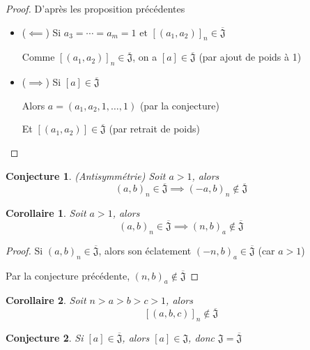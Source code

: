 \documentclass{article}
\newtheorem{conjecture}{Conjecture}
\newtheorem{corollary}{Corollaire}
\newcommand{\J}{\mathfrak{J}}
\newcommand{\JS}{\overline{\J}}
\begin{document}
\begin{proof} D'après les proposition précédentes
    \begin{itemize}
        \item ($\impliedby$) Si $a_3 = \cdots = a_m = 1 \text{ et } {[(a_1, a_2)]}_n \in \JS$
        
            Comme ${[(a_1, a_2)]}_n \in \JS$, on a $[a] \in \JS$ (par ajout de poids à 1)
        \item ($\implies$) Si $[a] \in \JS$

            Alors $a = (a_1, a_2, 1, \dots, 1)$  (par la conjecture)

            Et $[(a_1, a_2)] \in \JS$ (par retrait de poids)
    \end{itemize}
\end{proof}

\newpage

\begin{conjecture} (Antisymmétrie) Soit $a > 1$, alors
    \[ {(a, b)}_n \in \JS \implies {(-a, b)}_n \not \in \JS \]
\end{conjecture}

\begin{corollary}
    Soit $a > 1$, alors
    \[ {(a, b)}_n \in \JS \implies {(n, b)}_a \not \in \JS \]
\end{corollary}

\begin{proof}
    Si ${(a, b)}_n \in \JS$, alors son éclatement ${(-n, b)}_a \in \JS$ (car $a > 1$)

    Par la conjecture précédente, ${(n, b)}_a \not \in \JS$
\end{proof}

\begin{corollary}
    Soit $n > a > b > c > 1$, alors
    \[ {[(a, b, c)]}_n \not \in \JS \]
\end{corollary}

\begin{conjecture}
    Si $[a] \in \JS$, alors $[a] \in \J$, donc $\J = \JS$
\end{conjecture}
\end{document}
